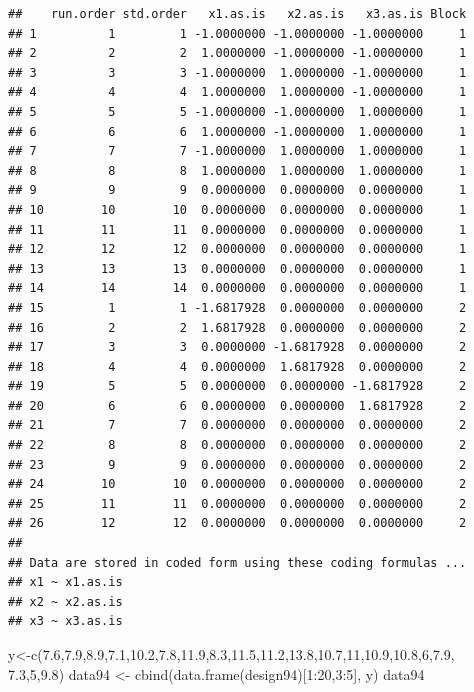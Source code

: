 \documentclass[
]{book}
\newenvironment{Shaded}{\begin{snugshade}}{\end{snugshade}}
\newcommand{\DecValTok}[1]{\textcolor[rgb]{0.00,0.00,0.81}{#1}}
\newcommand{\FloatTok}[1]{\textcolor[rgb]{0.00,0.00,0.81}{#1}}
\newcommand{\FunctionTok}[1]{\textcolor[rgb]{0.00,0.00,0.00}{#1}}
\newcommand{\NormalTok}[1]{#1}
\newcommand{\OtherTok}[1]{\textcolor[rgb]{0.56,0.35,0.01}{#1}}
\newcommand{\SpecialCharTok}[1]{\textcolor[rgb]{0.00,0.00,0.00}{#1}}
\theoremstyle{definition}
\theoremstyle{definition}
\theoremstyle{definition}
\theoremstyle{definition}
\theoremstyle{remark}
\begin{document}
\begin{verbatim}
##    run.order std.order   x1.as.is   x2.as.is   x3.as.is Block
## 1          1         1 -1.0000000 -1.0000000 -1.0000000     1
## 2          2         2  1.0000000 -1.0000000 -1.0000000     1
## 3          3         3 -1.0000000  1.0000000 -1.0000000     1
## 4          4         4  1.0000000  1.0000000 -1.0000000     1
## 5          5         5 -1.0000000 -1.0000000  1.0000000     1
## 6          6         6  1.0000000 -1.0000000  1.0000000     1
## 7          7         7 -1.0000000  1.0000000  1.0000000     1
## 8          8         8  1.0000000  1.0000000  1.0000000     1
## 9          9         9  0.0000000  0.0000000  0.0000000     1
## 10        10        10  0.0000000  0.0000000  0.0000000     1
## 11        11        11  0.0000000  0.0000000  0.0000000     1
## 12        12        12  0.0000000  0.0000000  0.0000000     1
## 13        13        13  0.0000000  0.0000000  0.0000000     1
## 14        14        14  0.0000000  0.0000000  0.0000000     1
## 15         1         1 -1.6817928  0.0000000  0.0000000     2
## 16         2         2  1.6817928  0.0000000  0.0000000     2
## 17         3         3  0.0000000 -1.6817928  0.0000000     2
## 18         4         4  0.0000000  1.6817928  0.0000000     2
## 19         5         5  0.0000000  0.0000000 -1.6817928     2
## 20         6         6  0.0000000  0.0000000  1.6817928     2
## 21         7         7  0.0000000  0.0000000  0.0000000     2
## 22         8         8  0.0000000  0.0000000  0.0000000     2
## 23         9         9  0.0000000  0.0000000  0.0000000     2
## 24        10        10  0.0000000  0.0000000  0.0000000     2
## 25        11        11  0.0000000  0.0000000  0.0000000     2
## 26        12        12  0.0000000  0.0000000  0.0000000     2
## 
## Data are stored in coded form using these coding formulas ...
## x1 ~ x1.as.is
## x2 ~ x2.as.is
## x3 ~ x3.as.is
\end{verbatim}

\begin{Shaded}
\begin{Highlighting}[]
\NormalTok{y}\OtherTok{\textless{}{-}}\FunctionTok{c}\NormalTok{(}\FloatTok{7.6}\NormalTok{,}\FloatTok{7.9}\NormalTok{,}\FloatTok{8.9}\NormalTok{,}\FloatTok{7.1}\NormalTok{,}\FloatTok{10.2}\NormalTok{,}\FloatTok{7.8}\NormalTok{,}\FloatTok{11.9}\NormalTok{,}\FloatTok{8.3}\NormalTok{,}\FloatTok{11.5}\NormalTok{,}\FloatTok{11.2}\NormalTok{,}\FloatTok{13.8}\NormalTok{,}\FloatTok{10.7}\NormalTok{,}\DecValTok{11}\NormalTok{,}\FloatTok{10.9}\NormalTok{,}\FloatTok{10.8}\NormalTok{,}\DecValTok{6}\NormalTok{,}\FloatTok{7.9}\NormalTok{,}
     \FloatTok{7.3}\NormalTok{,}\DecValTok{5}\NormalTok{,}\FloatTok{9.8}\NormalTok{)}
\NormalTok{data94 }\OtherTok{\textless{}{-}} \FunctionTok{cbind}\NormalTok{(}\FunctionTok{data.frame}\NormalTok{(design94)[}\DecValTok{1}\SpecialCharTok{:}\DecValTok{20}\NormalTok{,}\DecValTok{3}\SpecialCharTok{:}\DecValTok{5}\NormalTok{], y)}
\NormalTok{data94}
\end{Highlighting}
\end{Shaded}
\end{document}
